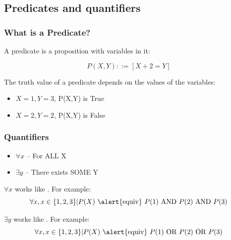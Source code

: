 \documentclass{beamer}
\begin{document}
\subsection{Predicates and quantifiers}
\begin{frame}
  \frametitle{What is a Predicate?}

  A predicate is a proposition with variables in it:

  \begin{equation*}
    P(X,Y) ::= [X+2 = Y]
  \end{equation*}

  \vfill

  The truth value of a predicate depends on the values of the variables:
  \begin{itemize}
  \item $X = 1, Y = 3$, P(X,Y) is True
  \item $X = 2, Y = 2$, P(X,Y) is False
  \end{itemize}
\end{frame}

\begin{frame}
  \frametitle{Quantifiers}

  \begin{itemize}
  \item $\forall x$ -- For ALL X

    \bigskip

  \item $\exists y$ -- There exists SOME Y
  \end{itemize}

  \vfill

  $\forall x$ works like . For example:
  \begin{equation*}
    \forall x, x \in \{1,2,3\}|P(X) \text{ \alert{equiv} } P(1) \text{ AND } P(2) \text{ AND } P(3)
  \end{equation*}

  \bigskip

  $\exists y$ works like . For example:
  \begin{equation*}
    \forall x, x \in \{1,2,3\}|P(X) \text{ \alert{equiv} } P(1) \text{ OR } P(2) \text{ OR } P(3)
  \end{equation*}
\end{frame}
\end{document}
